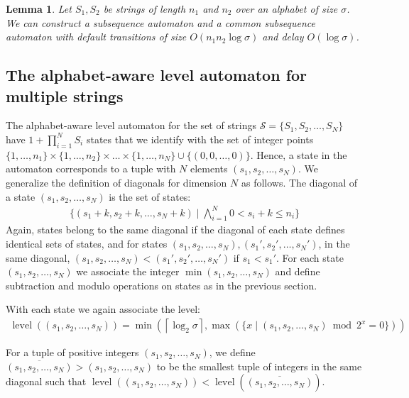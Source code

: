 \documentclass[a4paper,11pt]{article}
\newtheorem{lemma}{Lemma}
\DeclareMathOperator{\level}{level}
\begin{document}
\begin{lemma}
Let $S_1,S_2$ be strings of length $n_1$ and $n_2$ over an alphabet of size $\sigma$. We can construct a subsequence automaton and a common subsequence automaton with default transitions of size $O(n_1 n_2 \log \sigma)$ and delay $O(\log \sigma)$.
\end{lemma}

\subsection{The alphabet-aware level automaton for multiple strings}
The alphabet-aware level automaton for the set of strings $\mathcal{S}=\{S_1, S_2, \ldots, S_N\}$ have $1+\prod_{i=1}^N S_i$ states that we identify with the set of integer points $\{1,\ldots,  n_1 \}\times \{1,\ldots,  n_2 \}\times\ldots\times\{1,\ldots,  n_N \}\cup \{(0,0,\ldots, 0)\}$. Hence, a state in the automaton corresponds to a tuple with $N$ elements $(s_1,s_2,\ldots, s_N)$. We generalize the definition of diagonals for dimension $N$ as follows. The diagonal of a state $(s_1,s_2, \ldots, s_N)$ is the set of states:
\begin{gather*}
\{(s_1+k, s_2+k,\ldots, s_N+k) \;|\; \bigwedge\limits_{i=1}^N 0 < s_i+k \leq  n_i \}
\end{gather*}
Again, states belong to the same diagonal if the diagonal of each state defines identical sets of states, and for states $(s_1, s_2,\ldots, s_N),(s_1',s_2',\ldots, s_N')$, in the same diagonal, $(s_1, s_2,\ldots, s_N)<(s_1',s_2',\ldots, s_N')$ if $s_1 < s_1'$. For each state $(s_1, s_2, \ldots, s_N)$ we associate the integer $\min(s_1,s_2,\ldots, s_N)$ and define subtraction and modulo operations on states as in the previous section.

With each state we again associate the level:
\begin{gather*}
\level((s_1, s_2, \ldots, s_N)) = \min(\left\lceil \log_2 \sigma \right\rceil, \max(\{x \;|\; (s_1, s_2, \ldots, s_N) \bmod 2^x = 0 \}))
\end{gather*}

For a tuple of positive integers $(s_1,s_2, \ldots, s_N)$, we define $\overline{(s_1,s_2, \ldots, s_N)}>(s_1,s_2, \ldots, s_N)$ to be the smallest tuple of integers in the same diagonal such that $\level((s_1,s_2, \ldots, s_N)) < \level(\overline{(s_1,s_2, \ldots, s_N)})$.
\end{document}
